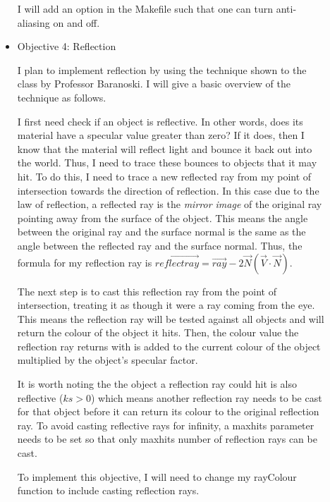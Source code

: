 \documentclass {article}
\begin{document}
\begin{description}
\begin{itemize}
	I will add an option in the Makefile such that one can turn anti-aliasing on and off.\newline
    	
    	\item Objective 4: Reflection\newline
    	
	I plan to implement reflection by using the technique shown to the class by Professor Baranoski. I will give a basic overview of the technique as follows. \newline
	
	I first need check if an object is reflective. In other words, does its material have a specular value greater than zero? If it does, then I know that the material will reflect light and bounce it back out into the world. Thus, I need to trace these bounces to objects that it may hit. To do this, I need to trace a new reflected ray from my point of intersection towards the direction of reflection. In this case due to the law of reflection, a reflected ray is the {\it mirror image} of the original ray pointing away from the surface of the object. This means the angle between the original ray and the surface normal is the same as the angle between the reflected ray and the surface normal. Thus, the formula for my reflection ray is $\vec{reflectray} = \vec{ray} - 2\vec{N}(\vec{V} \cdot \vec{N})$. \newline
	
	The next step is to cast this reflection ray from the point of intersection, treating it as though it were a ray coming from the eye. This means the reflection ray will be tested against all objects and will return the colour of the object it hits. Then, the colour value the reflection ray returns with is added to the current colour of the object multiplied by the object's specular factor. \newline
	
	It is worth noting the the object a reflection ray could hit is also reflective ($ks > 0$) which means another reflection ray needs to be cast for that object before it can return its colour to the original reflection ray. To avoid casting reflective rays for infinity, a maxhits parameter needs to be set so that only maxhits number of reflection rays can be cast. \newline
	
	\cite{lectures_refl} \cite{blinn_newell} \cite{de_greve} \newline 
	
	To implement this objective, I will need to change my rayColour function to include casting reflection rays. \newline
	

\end{itemize}
\end{description}
\end{document}
